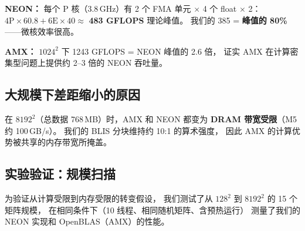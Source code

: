 \documentclass[11pt,a4paper]{article}
\begin{document}
\textbf{NEON：} 每个 P 核（3.8\,GHz）有 2 个 FMA 单元 $\times$ 4 个 float $\times$ 2：
$4\text{P}\times60.8 + 6\text{E}\times40 \approx$ \textbf{483 GFLOPS} 理论峰值。
我们的 385 = \textbf{峰值的 80\%}——微核效率很高。

\textbf{AMX：} $1024^2$ 下 1243 GFLOPS = NEON 峰值的 2.6 倍，
证实 AMX 在计算密集型问题上提供约 2--3 倍的 NEON 吞吐量。

\subsection{大规模下差距缩小的原因}

在 $8192^2$（总数据 768\,MB）时，AMX 和 NEON 都变为
\textbf{DRAM 带宽受限}（M5 约 100\,GB/s）。
我们的 BLIS 分块维持约 10:1 的算术强度，
因此 AMX 的计算优势被共享的内存带宽所掩盖。

\subsection{实验验证：规模扫描}

为验证从计算受限到内存受限的转变假设，
我们测试了从 $128^2$ 到 $8192^2$ 的 15 个矩阵规模，
在相同条件下（10 线程、相同随机矩阵、含预热运行）
测量了我们的 NEON 实现和 OpenBLAS（AMX）的性能。
\end{document}
